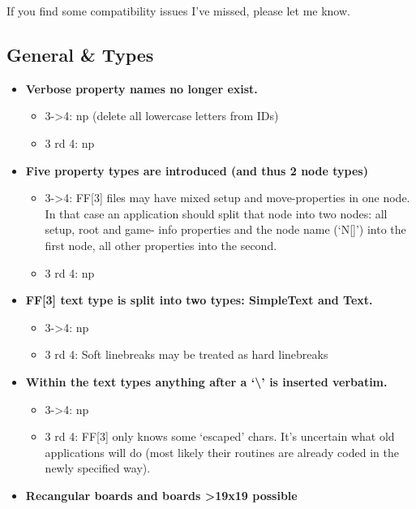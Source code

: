 If you find some compatibility issues I've missed, please let me know.

\subsection{General \& Types}\label{general-types}

\begin{itemize}
\tightlist
\item
  \textbf{Verbose property names no longer exist.}

  \begin{itemize}
  \item
    3-\textgreater4: np (delete all lowercase letters from IDs)
  \item
    3 rd 4: np
  \end{itemize}
\item
  \textbf{Five property types are introduced (and thus 2 node types)}

  \begin{itemize}
  \item
    3-\textgreater4: FF{[}3{]} files may have mixed setup and
    move-properties in one node. In that case an application should
    split that node into two nodes: all setup, root and game- info
    properties and the node name (`N{[}{]}') into the first node, all
    other properties into the second.
  \item
    3 rd 4: np
  \end{itemize}
\item
  \textbf{FF{[}3{]} text type is split into two types: SimpleText and
  Text.}

  \begin{itemize}
  \item
    3-\textgreater4: np
  \item
    3 rd 4: Soft linebreaks may be treated as hard linebreaks
  \end{itemize}
\item
  \textbf{Within the text types anything after a `\textbackslash{}' is
  inserted verbatim.}

  \begin{itemize}
  \item
    3-\textgreater4: np
  \item
    3 rd 4: FF{[}3{]} only knows some `escaped' chars. It's uncertain
    what old applications will do (most likely their routines are
    already coded in the newly specified way).
  \end{itemize}
\item
  \textbf{Recangular boards and boards \textgreater19x19 possible}


\end{itemize}
